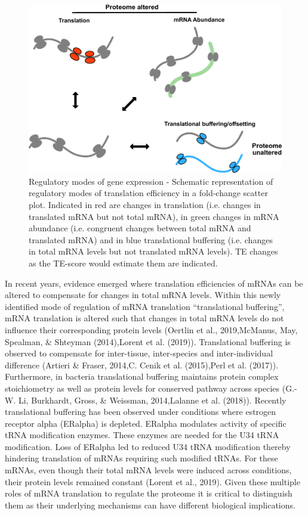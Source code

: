 \documentclass[12pt,openany]{book}
\begin{document}
\begin{figure}
  \includegraphics{./figures/geneModes_MRNA.pdf}
  \caption{Regulatory modes of gene expression - Schematic representation of regulatory modes of translation efficiency in a fold-change scatter plot. Indicated in red are changes in translation (i.e. changes in translated mRNA but not total mRNA), in green changes in mRNA abundance (i.e. congruent changes between total mRNA and translated mRNA) and in blue translational buffering (i.e. changes in total mRNA levels but not translated mRNA levels). TE changes as the TE-score would estimate them are indicated.\label{fig:mRNA}}
\end{figure}

In recent years, evidence emerged where translation efficiencies of
mRNAs can be altered to compensate for changes in total mRNA levels.
Within this newly identified mode of regulation of mRNA translation
``translational buffering'', mRNA translation is altered such that
changes in total mRNA levels do not influence their corresponding
protein levels (Oertlin et al., 2019,McManus, May, Spealman, \& Shteyman
(2014),Lorent et al. (2019)). Translational buffering is observed to
compensate for inter-tissue, inter-species and inter-individual
difference (Artieri \& Fraser, 2014,C. Cenik et al. (2015),Perl et al.
(2017)). Furthermore, in bacteria translational buffering maintains
protein complex stoichiometry as well as protein levels for conserved
pathway across species (G.-W. Li, Burkhardt, Gross, \& Weissman,
2014,Lalanne et al. (2018)). Recently translational buffering has been
observed under conditions where estrogen receptor alpha (ERalpha) is
depleted. ERalpha modulates activity of specific tRNA modification
enzymes. These enzymes are needed for the U34 tRNA modification. Loss of
ERalpha led to reduced U34 tRNA modification thereby hindering
translation of mRNAs requiring such modified tRNAs. For these mRNAs,
even though their total mRNA levels were induced across conditions,
their protein levels remained constant (Lorent et al., 2019). Given
these multiple roles of mRNA translation to regulate the proteome it is
critical to distinguish them as their underlying mechanisms can have
different biological implications.
\end{document}
